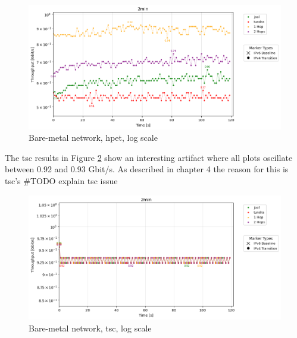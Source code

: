 \begin{figure}[H]
    \centering
    \includegraphics[width=1\textwidth]{resources/finalPlots/combinedplots/DoubleLocal_tcp_sameScale_hpet_2min_log.png}
    \caption{Bare-metal network, hpet, log scale}
    \label{fig:Dual_tcp_sameScale_hpet_log}
\end{figure}

The tsc results in Figure \ref{fig:Dual_tcp_sameScale_tsc_log} show an interesting artifact where all plots oscillate between 0.92 and 0.93 Gbit/s. 
As described in chapter 4 the reason for this is tsc's 
#TODO explain tsc issue


\begin{figure}[H]
    \centering
    \includegraphics[width=1\textwidth]{resources/finalPlots/combinedplots/DoubleLocal_tcp_sameScale_tsc_2min_log.png}
    \caption{Bare-metal network, tsc, log scale}
    \label{fig:Dual_tcp_sameScale_tsc_log}
\end{figure}

